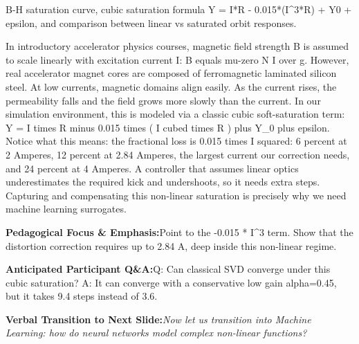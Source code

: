 \documentclass[11pt,a4paper]{article}
\begin{document}
\vspace{0.2em}
\begin{tcolorbox}[colback=lightbg,colframe=bordergray,title={\footnotesize\bfseries\color{darkgray}Slide Visual Blueprint},fontupper=\small,left=6pt,right=6pt,top=2.5pt,bottom=2.5pt,boxrule=0.6pt,arc=2.5pt]
B-H saturation curve, cubic saturation formula Y = I*R - 0.015*(I\textasciicircum{}3*R) + Y0 + epsilon, and comparison between linear vs saturated orbit responses.
\end{tcolorbox}
\vspace{0.2em}
\begin{tcolorbox}[colback=white,colframe=primaryblue,title={\footnotesize\bfseries\color{white}Spoken Presenter Script},fontupper=\small,left=6pt,right=6pt,top=3pt,bottom=3pt,boxrule=0.8pt,arc=2.5pt]
In introductory accelerator physics courses, magnetic field strength B is assumed to scale linearly with excitation current I: B equals mu-zero N I over g. However, real accelerator magnet cores are composed of ferromagnetic laminated silicon steel. At low currents, magnetic domains align easily. As the current rises, the permeability falls and the field grows more slowly than the current. In our simulation environment, this is modeled via a classic cubic soft-saturation term: Y = I times R minus 0.015 times ( I cubed times R ) plus Y\_0 plus epsilon. Notice what this means: the fractional loss is 0.015 times I squared: 6 percent at 2 Amperes, 12 percent at 2.84 Amperes, the largest current our correction needs, and 24 percent at 4 Amperes. A controller that assumes linear optics underestimates the required kick and undershoots, so it needs extra steps. Capturing and compensating this non-linear saturation is precisely why we need machine learning surrogates.
\end{tcolorbox}
\vspace{0.2em}
\begin{tcolorbox}[colback=lightbg,colframe=bordergray,left=6pt,right=6pt,top=3pt,bottom=3pt,boxrule=0.6pt,arc=2.5pt]
\small
\noindent\textbf{\color{navy}Pedagogical Focus \& Emphasis:}\enspace Point to the -0.015 * I\textasciicircum{}3 term. Show that the distortion correction requires up to 2.84 A, deep inside this non-linear regime.\par\vspace{0.3em}
\noindent\textbf{\color{successgreen}Anticipated Participant Q\&A:}\enspace Q: Can classical SVD converge under this cubic saturation? A: It can converge with a conservative low gain alpha=0.45, but it takes 9.4 steps instead of 3.6.\par\vspace{0.3em}
\noindent\textbf{\color{accent}Verbal Transition to Next Slide:}\enspace \emph{Now let us transition into Machine Learning: how do neural networks model complex non-linear functions?}
\end{tcolorbox}
\end{document}
